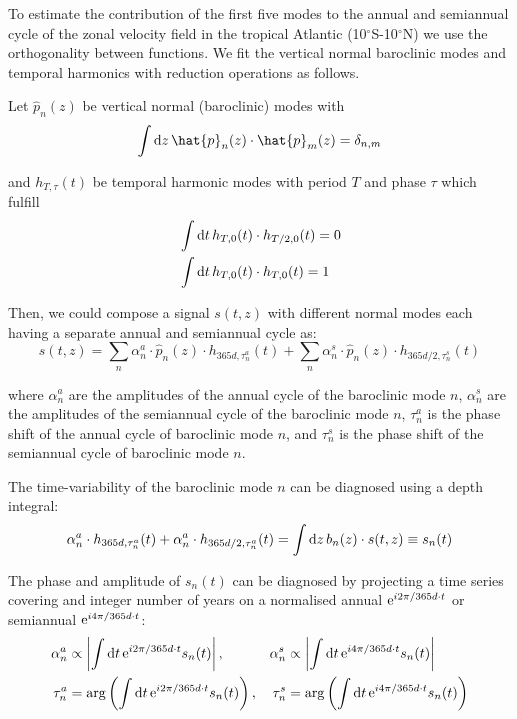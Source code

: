 \documentclass[os, manuscript]{copernicus}
\begin{document}
To estimate the contribution of the first five modes to the annual and semiannual cycle of the zonal velocity field in the tropical Atlantic (10$^{\circ}$S-10$^{\circ}$N) we use the orthogonality between functions. We fit the vertical normal baroclinic modes and temporal harmonics with reduction operations as follows.

Let $\hat{p}_n(z)$ be vertical normal (baroclinic) modes with 
\begin{equation}
	\int {\rm d}z\, \hat{p}_n(z) \cdot \hat{p}_m(z) = \delta_{n,m} 
\end{equation}

and $h_{T,\tau}(t)$ be temporal harmonic modes with period $T$ and phase $\tau$ which fulfill 
\begin{align}
	&\int {\rm d}t\, h_{T,0}(t) \cdot h_{T/2,0}(t) = 0\\
	&\int {\rm d}t\, h_{T,0}(t) \cdot h_{T,0}(t) = 1
\end{align}

Then, we could compose a signal $s(t, z)$ with different normal modes each having a separate annual and semiannual cycle as: 
\begin{equation}
	s(t, z)= \sum_n \alpha^a_n \cdot \hat{p}_n(z) \cdot h_{365d, \tau^a_n}(t) + \sum_n \alpha^s_n \cdot \hat{p}_n(z) \cdot h_{365d/2, \tau^s_n}(t)
\end{equation} 

where $\alpha^a_n$ are the amplitudes of the annual cycle of the baroclinic mode $n$, $\alpha^s_n$ are the amplitudes of the semiannual cycle of the baroclinic mode $n$, $\tau^a_n$ is the phase shift of the annual cycle of baroclinic mode $n$, and $\tau^s_n$ is the phase shift of the semiannual cycle of baroclinic mode $n$. 

The time-variability of the baroclinic mode $n$ can be diagnosed using a depth integral: 
\begin{equation}
	\alpha^a_n \cdot h_{365d,\tau^a_n}(t) + \alpha^a_n \cdot h_{365d/2,\tau^a_n}(t) = \int {\rm d}z\, b_n(z) \cdot s(t,z) \equiv s_n(t)
\end{equation}

The phase and amplitude of $s_n(t)$ can be diagnosed by projecting a time series covering and integer number of years on a normalised annual ${\rm e}^{i2\pi/365d \cdot t}$ or semiannual ${\rm e}^{i4\pi/365d \cdot t}$: 
\begin{align}
	\alpha^a_n &\propto \left|\int {\rm d}t\, {\rm e}^{i2\pi/365d \cdot t} s_n(t)\right|,
	&\alpha^s_n &\propto \left|\int {\rm d}t\, {\rm e}^{i4\pi/365d \cdot t} s_n(t)\right| \\
	\tau^a_n &= {\rm arg}\left(\int {\rm d}t\, {\rm e}^{i2\pi/365d \cdot t} s_n(t)\right),
	&\tau^s_n &= {\rm arg}\left(\int {\rm d}t\, {\rm e}^{i4\pi/365d \cdot t} s_n(t)\right) 
\end{align}
\end{document}
